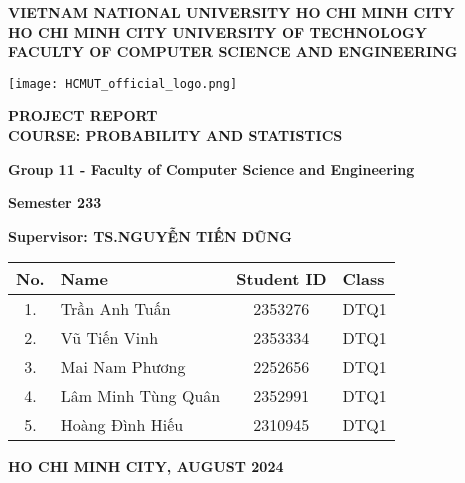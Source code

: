 \documentclass{article}
\date{August 2024}
\begin{document}
	
	\begin{titlepage}
		\centering
		
		\textbf{\large VIETNAM NATIONAL UNIVERSITY HO CHI MINH CITY\\}
		\textbf{\large HO CHI MINH CITY UNIVERSITY OF TECHNOLOGY\\}
		\textbf{\large FACULTY OF COMPUTER SCIENCE AND ENGINEERING\\}
		
		\vspace{1cm}
		
		\texttt{[image: HCMUT\_official\_logo.png]}\\  %
		
		\vspace{1cm}
		
		\textbf{\Huge PROJECT REPORT\\}
		\textbf{\Large COURSE: PROBABILITY AND STATISTICS\\}
		
		\vspace{1cm}
		
		\textbf{\LARGE Group 11 - Faculty of Computer Science and Engineering\\}
		
		\vspace{1cm}
		
		\textbf{\Large Semester 233\\}
		
		
		\textbf{\Large Supervisor: TS.NGUYỄN TIẾN DŨNG\\}
		
		\vspace{1cm}
		
		\begin{tabular}{|c|l|c|l|}
			\hline
			\textbf{No.} & \textbf{Name} & \textbf{Student ID} & \textbf{Class} \\
			\hline
			1. & Trần Anh Tuấn & 2353276  & DTQ1 \\
			2. & Vũ Tiến Vinh & 2353334 & DTQ1 \\
			3. & Mai Nam Phương & 2252656  & DTQ1 \\
			4. & Lâm Minh Tùng Quân & 2352991  & DTQ1 \\
			5. & Hoàng Đình Hiếu & 2310945 & DTQ1 \\
			\hline
		\end{tabular}
		
		\vspace{1cm}
		
		\textbf{HO CHI MINH CITY, AUGUST 2024}
		
	\end{titlepage}
	\renewcommand*\contentsname{\textbf{TABLE OF CONTENTS}}
	\newpage
	\tableofcontents
	\newpage
	
\end{document}
